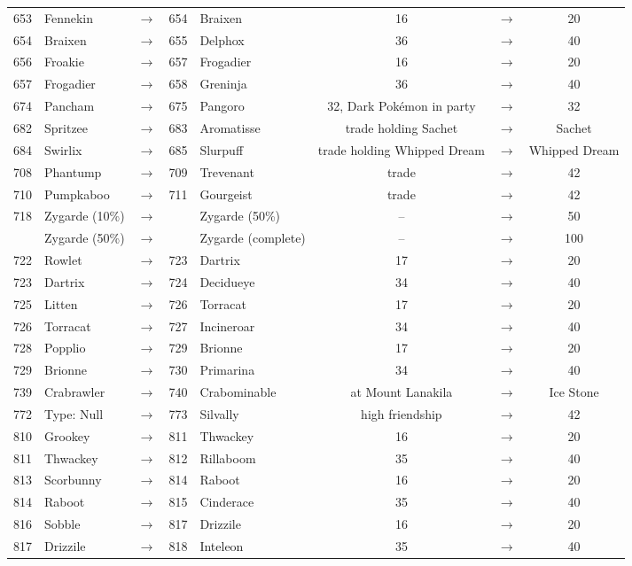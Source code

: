 \documentclass{article}
\begin{document}
\begin{longtable}{rlcrl|ccc}
653 & Fennekin & $\rightarrow$ & 654 & Braixen & 16 & $\rightarrow$ & 20 \\
654 & Braixen & $\rightarrow$ & 655 & Delphox & 36 & $\rightarrow$ & 40 \\
656 & Froakie & $\rightarrow$ & 657 & Frogadier & 16 & $\rightarrow$ & 20 \\
657 & Frogadier & $\rightarrow$ & 658 & Greninja & 36 & $\rightarrow$ & 40 \\
674 & Pancham & $\rightarrow$ & 675 & Pangoro & 32, Dark Pok\'emon in party & $\rightarrow$ & 32 \\
682 & Spritzee & $\rightarrow$ & 683 & Aromatisse & trade holding Sachet & $\rightarrow$ & Sachet \\
684 & Swirlix & $\rightarrow$ & 685 & Slurpuff & trade holding Whipped Dream & $\rightarrow$ & Whipped Dream \\
708 & Phantump & $\rightarrow$ & 709 & Trevenant & trade & $\rightarrow$ & 42 \\
710 & Pumpkaboo & $\rightarrow$ & 711 & Gourgeist & trade & $\rightarrow$ & 42 \\
718 & Zygarde (10\%) & $\rightarrow$ &  & Zygarde (50\%) & -- & $\rightarrow$ & 50 \\
    & Zygarde (50\%) & $\rightarrow$ &  & Zygarde (complete) & -- & $\rightarrow$ & 100 \\
\hline %
722 & Rowlet & $\rightarrow$ & 723 & Dartrix & 17 & $\rightarrow$ & 20 \\
723 & Dartrix & $\rightarrow$ & 724 & Decidueye & 34 & $\rightarrow$ & 40 \\
725 & Litten & $\rightarrow$ & 726 & Torracat & 17 & $\rightarrow$ & 20 \\
726 & Torracat & $\rightarrow$ & 727 & Incineroar & 34 & $\rightarrow$ & 40 \\
728 & Popplio & $\rightarrow$ & 729 & Brionne & 17 & $\rightarrow$ & 20 \\
729 & Brionne & $\rightarrow$ & 730 & Primarina & 34 & $\rightarrow$ & 40 \\
739 & Crabrawler & $\rightarrow$ & 740 & Crabominable & at Mount Lanakila & $\rightarrow$ & Ice Stone \\
772 & Type: Null & $\rightarrow$ & 773 & Silvally & high friendship & $\rightarrow$ & 42 \\
\hline %
810 & Grookey & $\rightarrow$ & 811 & Thwackey & 16 & $\rightarrow$ & 20 \\
811 & Thwackey & $\rightarrow$ & 812 & Rillaboom & 35 & $\rightarrow$ & 40 \\
813 & Scorbunny & $\rightarrow$ & 814 & Raboot & 16 & $\rightarrow$ & 20 \\
814 & Raboot & $\rightarrow$ & 815 & Cinderace & 35 & $\rightarrow$ & 40 \\
816 & Sobble & $\rightarrow$ & 817 & Drizzile & 16 & $\rightarrow$ & 20 \\
817 & Drizzile & $\rightarrow$ & 818 & Inteleon & 35 & $\rightarrow$ & 40 \\
\end{longtable}
\end{document}
